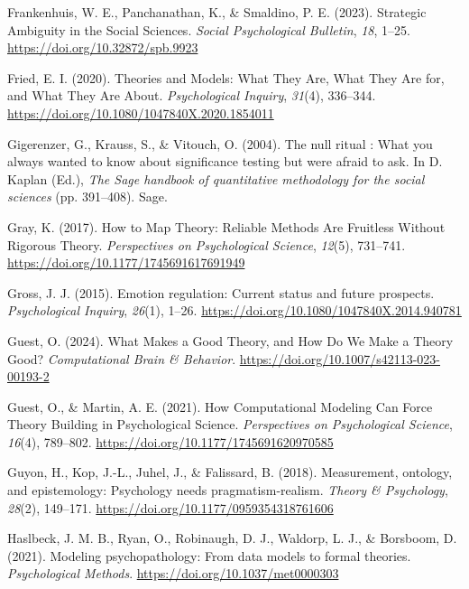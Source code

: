 \documentclass[
  man, noextraspace,floatsintext]{apa7}
\newlength{\cslhangindent}
\newenvironment{CSLReferences}[2] %
 {\begin{list}{}{%
  \setlength{\itemindent}{0pt}
  \setlength{\leftmargin}{0pt}
  \setlength{\parsep}{0pt}
  \ifodd #1
   \setlength{\leftmargin}{\cslhangindent}
   \setlength{\itemindent}{-1\cslhangindent}
  \fi
  \setlength{\itemsep}{#2\baselineskip}}}
 {\end{list}}
\begin{document}
\begin{CSLReferences}{1}{0}
Frankenhuis, W. E., Panchanathan, K., \& Smaldino, P. E. (2023). Strategic {Ambiguity} in the {Social Sciences}. \emph{Social Psychological Bulletin}, \emph{18}, 1--25. \url{https://doi.org/10.32872/spb.9923}

Fried, E. I. (2020). Theories and {Models}: {What They Are}, {What They Are} for, and {What They Are About}. \emph{Psychological Inquiry}, \emph{31}(4), 336--344. \url{https://doi.org/10.1080/1047840X.2020.1854011}

Gigerenzer, G., Krauss, S., \& Vitouch, O. (2004). The null ritual : {What} you always wanted to know about significance testing but were afraid to ask. In D. Kaplan (Ed.), \emph{The {Sage} handbook of quantitative methodology for the social sciences} (pp. 391--408). Sage.

Gray, K. (2017). How to {Map Theory}: {Reliable Methods Are Fruitless Without Rigorous Theory}. \emph{Perspectives on Psychological Science}, \emph{12}(5), 731--741. \url{https://doi.org/10.1177/1745691617691949}

Gross, J. J. (2015). Emotion regulation: {Current} status and future prospects. \emph{Psychological Inquiry}, \emph{26}(1), 1--26. \url{https://doi.org/10.1080/1047840X.2014.940781}

Guest, O. (2024). What {Makes} a {Good Theory}, and {How Do We Make} a {Theory Good}? \emph{Computational Brain \& Behavior}. \url{https://doi.org/10.1007/s42113-023-00193-2}

Guest, O., \& Martin, A. E. (2021). How {Computational Modeling Can Force Theory Building} in {Psychological Science}. \emph{Perspectives on Psychological Science}, \emph{16}(4), 789--802. \url{https://doi.org/10.1177/1745691620970585}

Guyon, H., Kop, J.-L., Juhel, J., \& Falissard, B. (2018). Measurement, ontology, and epistemology: {Psychology} needs pragmatism-realism. \emph{Theory \& Psychology}, \emph{28}(2), 149--171. \url{https://doi.org/10.1177/0959354318761606}

Haslbeck, J. M. B., Ryan, O., Robinaugh, D. J., Waldorp, L. J., \& Borsboom, D. (2021). Modeling psychopathology: {From} data models to formal theories. \emph{Psychological Methods}. \url{https://doi.org/10.1037/met0000303}


\end{CSLReferences}
\end{document}
